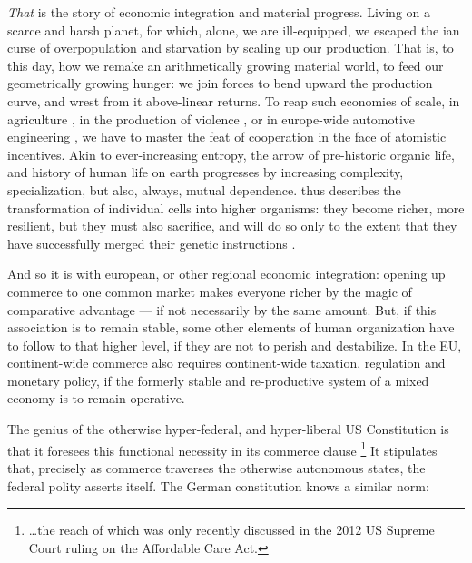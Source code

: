 \emph{That} is the story of economic integration and material progress.
Living on a scarce and harsh planet, for which, alone, we are ill-equipped, we escaped the \citeauthor{Malthus1798}ian curse of overpopulation and starvation by scaling up our production.
That is, to this day, how we remake an arithmetically growing material world, to feed our geometrically growing hunger:
we join forces to bend upward the production curve, and wrest from it above-linear returns.
To reap such economies of scale, in agriculture \citep{Diamond1997}, in the production of violence \citep{Tilly-1985-aa}, or in europe-wide automotive engineering \citep{Krugman-1980-aa}, we have to master the feat of cooperation in the face of atomistic incentives.
Akin to ever-increasing entropy, the arrow of pre-historic organic life, and history of human life on earth progresses by increasing complexity, specialization, but also, always, mutual dependence.
\citeauthor{Wright1994} thus describes the transformation of individual cells into higher organisms:
they become richer, more resilient, but they must also sacrifice, and will do so only to the extent that they have successfully merged their genetic instructions \citeyearpar[Chapters 7, 8]{Wright1994}.

And so it is with european, or other regional economic integration:
opening up commerce to one common market makes everyone richer by the magic of comparative advantage --- if not necessarily by the same amount.
But, if this association is to remain stable, some other elements of human organization have to follow to that higher level, if they are not to perish and destabilize.
In the \gls{EU}, continent-wide commerce also requires continent-wide taxation, regulation and monetary policy, if the formerly stable and re-productive system of a mixed economy is to remain operative.

The genius of the otherwise hyper-federal, and hyper-liberal US Constitution is that it foresees this functional necessity in its commerce clause
\footnote{
	\ldots the reach of which was only recently discussed in the 2012 US Supreme Court ruling on the Affordable Care Act.
}
It stipulates that, precisely as commerce traverses the otherwise autonomous states, the federal polity asserts itself.
The German constitution knows a similar norm:

